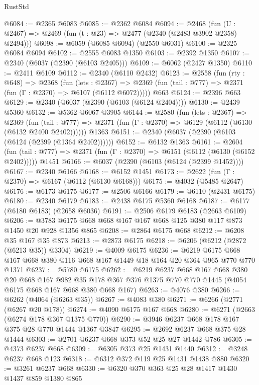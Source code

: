 \begin{lexlean}{RustStd}
\begin{coremodule}
@6084 := @2365 @6083
@6085 := @2362 @6084
@6094 := @2468 (fun (U : @2467) => @2469 (fun (t : @23) => @2477 (@2340 (@2483 @3902 @2358) @2494)))
@6098 := @6059 (@6085 @6094) (@2550 @6031)
@6100 := @2325 @6084 @6094
@6102 := @2555 @6083 @1350
@6103 := @2392 @1350
@6107 := @2340 (@6037 (@2390 (@6103 @2405)))
@6109 := @6062 (@2427 @1350)
@6110 := @2411 @6109
@6112 := @2340 (@6110 @2432)
@6123 := @2558
    (fun (rty : @648) =>
    @2368
      (fun (lets : @2367) =>
      @2369 (fun (tail : @777) => @2371 (fun (Γ : @2370) => @6107 (@6112 @6072)))))
    @663
@6124 := @2396 @663
@6129 := @2340 (@6037 (@2390 (@6103 (@6124 @2404))))
@6130 := @2439 @5360
@6132 := @5362 @6067 @3905
@6144 := @2580
    (fun (lets : @2367) =>
    @2369
      (fun (tail : @777) => @2371 (fun (Γ : @2370) => @6129 (@6112 (@6130 (@6132 @2400 @2402))))))
    @1363
@6151 := @2340 (@6037 (@2390 (@6103 (@6124 (@2399 (@1364 @2402))))))
@6152 := @6132 @1363
@6161 := @2604
    (fun (tail : @777) => @2371 (fun (Γ : @2370) => @6151 (@6112 (@6130 (@6152 @2402)))))
    @1451
@6166 := @6037 (@2390 (@6103 (@6124 (@2399 @1452))))
@6167 := @2340 @6166
@6168 := @6152 @1451
@6173 := @2622 (fun (Γ : @2370) => @6167 (@6112 (@6130 @6168)))
@6175 := @4032 (@5485 @2647)
@6176 := @6173 @6175
@6177 := @2506 @6166
@6179 := @6110 (@2431 @6175)
@6180 := @2340 @6179
@6183 := @2438 @6175 @5360 @6168
@6187 := @6177 (@6180 @6183) (@2658 @6036)
@6191 := @2506 @6179 @6183 (@2663 @6109)
@6206 := @3783 @6175 @668 @668 @167 @167 @668 @125 @380 @117 @873 @1450 @20 @928 @1356 @865
@6208 := @2864 @6175 @668
@6212 := @6208 @35 @167 @35 @873
@6213 := @2873 @6175
@6218 := @6206 (@6212 (@2872 (@6213 @35)) @3304)
@6219 := @4009 @6175
@6236 := @6219 @6175 @668 @167 @668 @380 @116 @668 @167 @1449 @18 @164 @20 @364 @965 @770 @770 @1371
@6237 := @5780 @6175
@6262 := @6219
    @6237
    @668
    @167
    @668
    @380
    @20
    @668
    @167
    @982
    @35
    @178
    @367
    @376
    @1375
    @770
    @770
    @1445
    (@4054 @6175 @668 @167 @668 @380 @668 @167)
@6263 := @4076 @380
@6266 := @6262 (@4064 (@6263 @35))
@6267 := @4083 @380
@6271 := @6266 (@2771 (@6267 @20 @178))
@6274 := @4090 @6175 @167 @668
@6280 := @6271 (@2663 (@6274 @178 @367 @1375 @770))
@6290 := @3946 @6237 @668 @178 @167 @375 @28 @770 @1444 @1367 @3847
@6295 := @2692 @6237 @668 @375 @28 @1444
@6303 := @2701 @6237 @668 @373 @52 @25 @27 @1442 @786
@6305 := @4373 @6237 @668
@6309 := @6305 @373 @25 @1431 @1440
@6312 := @3248 @6237 @668 @123
@6318 := @6312 @372 @119 @25 @1431 @1438 @880
@6320 := @3261 @6237 @668
@6330 := @6320 @370 @363 @25 @28 @1417 @1430 @1437 @859 @1380 @865

\end{coremodule}
\end{lexlean}
